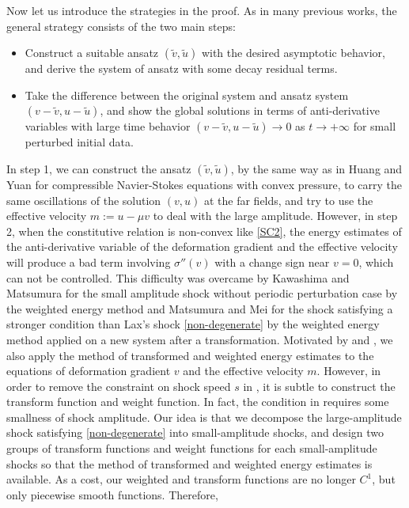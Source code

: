 \documentclass[12pt,reqno]{amsart}
\numberwithin{equation}{section}
\begin{document}
Now let us introduce the strategies in the proof. As in many previous works, the general strategy consists of the two main steps:
\begin{itemize}
	\item [1.] Construct a suitable ansatz $(\tilde{v},\tilde{u})$ with the desired asymptotic behavior, and derive the system of ansatz with some decay residual terms.
	\item[2.] Take the difference between the original system and ansatz system $(v-\tilde{v}, u-\tilde{u})$,  and show the global solutions in terms of anti-derivative variables with large time behavior  $(v-\tilde{v}, u-\tilde{u})\rightarrow 0$ as $t\rightarrow+\infty$ for small perturbed initial data.
\end{itemize}
In step 1, we can construct the ansatz $(\tilde{v},\tilde{u})$, by the same way as in Huang and Yuan \cite{HuangYuanCMP} for compressible Navier-Stokes equations with convex pressure, to carry the same oscillations of the solution $(v,u)$ at the far fields, and try to use the effective velocity $m:=u-\mu v$ to deal with the large amplitude. However, in step 2, when the constitutive relation is non-convex like \eqref{SC2},  the energy estimates of the anti-derivative variable of the deformation gradient and the effective velocity will produce a bad term involving $\sigma''(v)$ with  a change sign near $v=0$, which can not be controlled.  This difficulty was overcame by Kawashima and Matsumura \cite{InitialModel} for the small amplitude shock without periodic perturbation case by the weighted energy method and Matsumura and Mei \cite{Gaijin} for the shock satisfying a stronger condition than Lax's shock \eqref{non-degenerate} by  the weighted energy method applied on a new system after a transformation.  Motivated by \cite{Gaijin} and \cite{InitialModel}, 
we also apply the method of transformed and  weighted energy estimates to the equations of deformation gradient $v$ and the effective velocity $m$. However, in order to remove the constraint on shock speed $s$ in \cite{Gaijin}, it is subtle to construct the transform function and weight function. In fact, the condition in \cite{Gaijin} requires some smallness of shock amplitude. Our idea is that we decompose the large-amplitude shock satisfying \eqref{non-degenerate} into small-amplitude shocks, and 
design two groups of transform functions and weight functions for each small-amplitude shocks so that the method of transformed and  weighted energy estimates is available. As a cost, our weighted and transform functions are no longer $C^1$, but only piecewise smooth functions. Therefore, 
\end{document}
